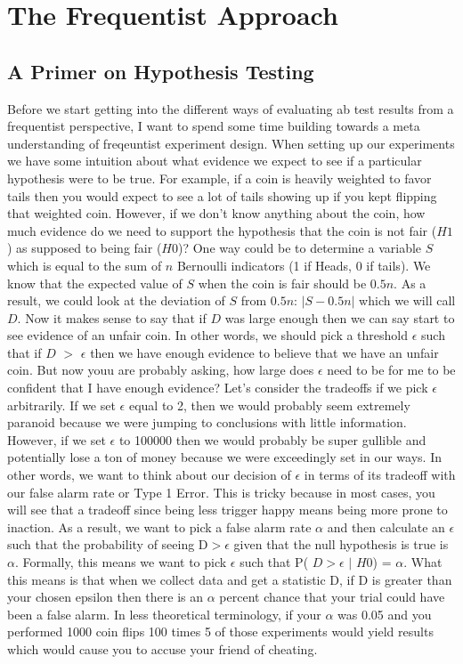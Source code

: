 \section{The Frequentist Approach\label{sec:freq}}

\subsection{A Primer on Hypothesis Testing}

Before we start getting into the different ways of evaluating ab test results from a frequentist perspective, I want to spend some time building 
towards a meta understanding of freqeuntist experiment design. When setting up our experiments we have 
some intuition about what evidence we expect to see if a particular hypothesis were to be 
true. For example, if a coin is heavily weighted to favor tails then you would expect to see 
a lot of tails showing up if you kept flipping that weighted coin. 
However, if we don’t know anything about the coin, how much evidence do we need to support 
the hypothesis that the coin is not fair (\(H1\)) as supposed to being fair (\(H0\))? 
One way could be to determine a variable \(S\) which is equal to the sum of \(n\) Bernoulli 
indicators (1 if Heads, 0 if tails). We know that the expected value of \(S\) when the coin is fair should be \(0.5n\).
As a result, we could look at the deviation of \(S\) from \(0.5n\): \(|S-0.5n|\) which we will call \(D\). 
Now it makes sense to say that if \(D\) was large enough then we can say start to see evidence of an unfair coin. 
In other words, we should pick a threshold $\epsilon$ such that if \(D\) $>$ $\epsilon$ then we have enough evidence to believe
that we have an unfair coin. But now youu are probably asking, how large does $\epsilon$ need to be for me
to be confident that I have enough evidence? Let's consider the tradeoffs if we pick $\epsilon$ arbitrarily. 
If we set $\epsilon$ equal to 2, then we would probably seem extremely paranoid because we were jumping to conclusions with little information. However, if we set $\epsilon$ to 100000 then we would probably be super gullible and
potentially lose a ton of money because we were exceedingly set in our ways. In other words, we want to think about our decision of $\epsilon$ in terms
of its tradeoff with our false alarm rate or Type 1 Error. This is tricky because in most cases, you will see
that a tradeoff since being less trigger happy means being more prone to inaction. As a result, we want to pick
a false alarm rate $\alpha$ and then calculate an $\epsilon$ such that the probability of seeing D$>$$\epsilon$ 
given that the null hypothesis is true is $\alpha$. Formally, this means we want to pick $\epsilon$ such that 
P( \(D\)$>$$\epsilon$ $|$ \(H0\)) = $\alpha$. What this means is that when we collect data and get a statistic D, 
if D is greater than your chosen epsilon then there is an $\alpha$ percent chance that your trial could have been 
a false alarm. In less theoretical terminology, if your $\alpha$ was 0.05 and you performed 1000 coin flips 100 times
5 of those experiments would yield results which would cause you to accuse your friend of cheating.

